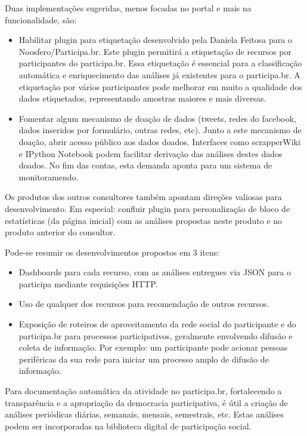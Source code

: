 \documentclass[12pt]{article}
\begin{document}
Duas implementações sugeridas, menos focadas no portal e mais na funcionalidade, são:
\begin{itemize}
    \item Habilitar plugin para etiquetação desenvolvido pela Daniela Feitosa para o Noosfero/Participa.br. Este plugin permitirá a etiquetação de recursos por participantes do participa.br. Essa etiquetação é essencial para a classificação automática e enriquecimento das análises já existentes para o participa.br. A etiquetação por vários participantes pode melhorar em muito a qualidade dos dados etiquetados, representando amostras maiores e mais diversas.
    \item Fomentar algum mecanismo de doação de dados (tweets, redes do facebook, dados inseridos por formulário, outras redes, etc). Junto a este mecanismo de doação, abrir acesso público aos dados doados. Interfaces como scrapperWiki e IPython Notebook podem facilitar derivação das análises destes dados doados. No fim das contas, esta demanda aponta para um sistema de monitoramendo.
\end{itemize}

Os produtos dos outros consultores também apontam direções valiosas para desenvolvimento. Em especial:
    confluir plugin para personalização de bloco de estatísticas (da página inicial) com as análises propostas neste produto e no produto anterior do consultor.

Pode-se resumir os desenvolvimentos propostos em 3 itens:
\begin{itemize}
    \item Dashboards para cada recurso, com as análises entregues via JSON para o participa mediante requisições HTTP.
    \item Uso de qualquer dos recursos para recomendação de outros recursos.
    \item Exposição de roteiros de aproveitamento da rede social do participante e do participa.br para processos participativos, geralmente envolvendo difusão e coleta de informação. Por exemplo: um participante pode acionar pessoas periféricas da sua rede para iniciar um processo amplo de difusão de informação.
\end{itemize}


Para documentação automática da atividade no participa.br, fortalecendo a transparência e a apropriação da democracia participativa, é útil a criação de análises periódicas diárias, semanais, mensais, semestrais, etc. Estas análises podem ser incorporadas na biblioteca digital de participação social.
\end{document}
